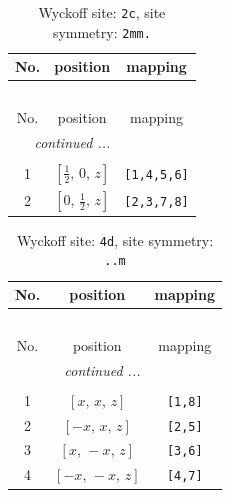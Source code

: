 \documentclass[fleqn,8pt]{jsarticle}
\begin{document}
\begin{longtable}{ccc}
\caption{Wyckoff site: {\tt 2c}, site symmetry: {\tt 2mm.}}
 \\
 \hline \hline
No. & position & mapping \\ \hline \endfirsthead

\multicolumn{2}{l}{\tablename\ \thetable{}} \\
 \hline \hline
No. & position & mapping \\ \hline \endhead

 \hline \hline
\multicolumn{2}{r}{\footnotesize\it continued ...} \\ \endfoot

 \hline \hline
\multicolumn{2}{r}{} \\ \endlastfoot

1 & $\left[ \frac{1}{2},\, 0,\, z \right]$ & {\tt [1,4,5,6]} \\ \hline
2 & $\left[ 0,\, \frac{1}{2},\, z \right]$ & {\tt [2,3,7,8]} \\
\end{longtable}
\renewcommand{\arraystretch}{1.2}
\begin{longtable}{ccc}
\caption{Wyckoff site: {\tt 4d}, site symmetry: {\tt ..m}}
 \\
 \hline \hline
No. & position & mapping \\ \hline \endfirsthead

\multicolumn{2}{l}{\tablename\ \thetable{}} \\
 \hline \hline
No. & position & mapping \\ \hline \endhead

 \hline \hline
\multicolumn{2}{r}{\footnotesize\it continued ...} \\ \endfoot

 \hline \hline
\multicolumn{2}{r}{} \\ \endlastfoot

1 & $\left[ x,\, x,\, z \right]$ & {\tt [1,8]} \\ \hline
2 & $\left[ - x,\, x,\, z \right]$ & {\tt [2,5]} \\ \hline
3 & $\left[ x,\, - x,\, z \right]$ & {\tt [3,6]} \\ \hline
4 & $\left[ - x,\, - x,\, z \right]$ & {\tt [4,7]} \\
\end{longtable}
\renewcommand{\arraystretch}{1.2}
\end{document}
